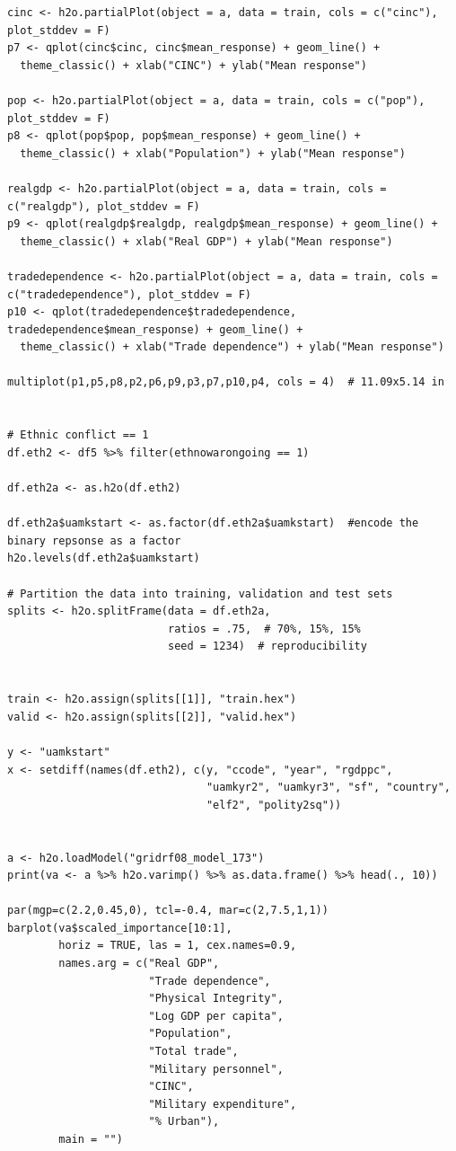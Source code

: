 \documentclass[a4paper,12pt]{article}
\begin{document}
\begin{verbatim}
cinc <- h2o.partialPlot(object = a, data = train, cols = c("cinc"), plot_stddev = F)
p7 <- qplot(cinc$cinc, cinc$mean_response) + geom_line() +
  theme_classic() + xlab("CINC") + ylab("Mean response")

pop <- h2o.partialPlot(object = a, data = train, cols = c("pop"), plot_stddev = F)
p8 <- qplot(pop$pop, pop$mean_response) + geom_line() +
  theme_classic() + xlab("Population") + ylab("Mean response")

realgdp <- h2o.partialPlot(object = a, data = train, cols = c("realgdp"), plot_stddev = F)
p9 <- qplot(realgdp$realgdp, realgdp$mean_response) + geom_line() +
  theme_classic() + xlab("Real GDP") + ylab("Mean response")

tradedependence <- h2o.partialPlot(object = a, data = train, cols = c("tradedependence"), plot_stddev = F)
p10 <- qplot(tradedependence$tradedependence, tradedependence$mean_response) + geom_line() +
  theme_classic() + xlab("Trade dependence") + ylab("Mean response")

multiplot(p1,p5,p8,p2,p6,p9,p3,p7,p10,p4, cols = 4)  # 11.09x5.14 in


# Ethnic conflict == 1
df.eth2 <- df5 %>% filter(ethnowarongoing == 1)

df.eth2a <- as.h2o(df.eth2)

df.eth2a$uamkstart <- as.factor(df.eth2a$uamkstart)  #encode the binary repsonse as a factor
h2o.levels(df.eth2a$uamkstart)

# Partition the data into training, validation and test sets
splits <- h2o.splitFrame(data = df.eth2a, 
                         ratios = .75,  # 70%, 15%, 15%
                         seed = 1234)  # reproducibility


train <- h2o.assign(splits[[1]], "train.hex")   
valid <- h2o.assign(splits[[2]], "valid.hex") 

y <- "uamkstart"
x <- setdiff(names(df.eth2), c(y, "ccode", "year", "rgdppc",
                               "uamkyr2", "uamkyr3", "sf", "country",
                               "elf2", "polity2sq")) 


a <- h2o.loadModel("gridrf08_model_173")
print(va <- a %>% h2o.varimp() %>% as.data.frame() %>% head(., 10)) 

par(mgp=c(2.2,0.45,0), tcl=-0.4, mar=c(2,7.5,1,1))
barplot(va$scaled_importance[10:1],
        horiz = TRUE, las = 1, cex.names=0.9,
        names.arg = c("Real GDP",
                      "Trade dependence",
                      "Physical Integrity",
                      "Log GDP per capita",
                      "Population",
                      "Total trade",
                      "Military personnel", 
                      "CINC",
                      "Military expenditure",
                      "% Urban"),
        main = "")


\end{verbatim}
\end{document}
